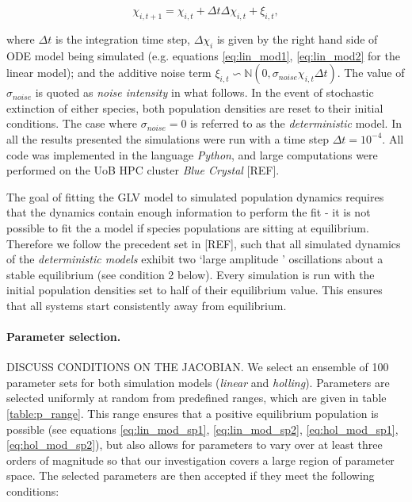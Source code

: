 \begin{equation}
\label{eq:stochastic_diff}
\chi_{i, t+1} = \chi_{i, t} + \Delta t\Delta\chi_{i,t} + \xi_{i,t},
\end{equation}

where $\Delta t$ is the integration time step, $\Delta\chi_{i}$ is given by the right hand side of ODE model being simulated (e.g. equations \ref{eq:lin_mod1}, \ref{eq:lin_mod2} for the linear model); and the additive noise term $\xi_{i,t} \backsim \mathbb{N}(0, \sigma_{noise}\chi_{i,t}\Delta t)$. The value of $\sigma_{noise}$ is quoted as \emph{noise intensity} in what follows. In the event of stochastic extinction of either species, both population densities are reset to their initial conditions. The case where $\sigma_{noise} = 0$ is referred to as the \emph{deterministic} model. In all the results presented the simulations were run with a time step $\Delta t = 10^{-4}$. All code was implemented in the language \emph{Python}, and large computations were performed on the UoB HPC cluster \emph{Blue Crystal} [REF].

The goal of fitting the GLV model to simulated population dynamics requires that the dynamics contain enough information to perform the fit - it is not possible to fit the a model if species populations are sitting at equilibrium. Therefore we follow the precedent set in [REF], such that all simulated dynamics of the \emph{deterministic models} exhibit two `large amplitude ' oscillations about a stable equilibrium (see condition 2 below). Every simulation is run with the initial population densities set to half of their equilibrium value. This ensures that all systems start consistently away from equilibrium.

\paragraph*{Parameter selection.} DISCUSS CONDITIONS ON THE JACOBIAN. We select an ensemble of 100 parameter sets for both simulation models (\emph{linear} and \emph{holling}). Parameters are selected uniformly at random from predefined ranges, which are given in table \ref{table:p_range}. This range ensures that a positive equilibrium population is possible (see equations \ref{eq:lin_mod_sp1}, \ref{eq:lin_mod_sp2}, \ref{eq:hol_mod_sp1}, \ref{eq:hol_mod_sp2}), but also allows for parameters to vary over at least three orders of magnitude so that our investigation covers a large region of parameter space. The selected parameters are then accepted if they meet the following conditions:


